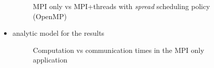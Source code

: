 \documentclass[twocolumn]{svjour3}          %
\begin{document}
\begin{itemize}
\begin{figure}[!h]\begin{center}
  \caption{MPI only vs MPI+threads with \emph{spread} scheduling policy (OpenMP)}
  \label{fig:mesh}
\end{center}\end{figure}

\item analytic model for the results

\begin{figure}[!h]\begin{center}
  \caption{Computation vs communication times in the MPI only application}
  \label{fig:mesh}
\end{center}\end{figure}

\end{itemize}
\end{document}
